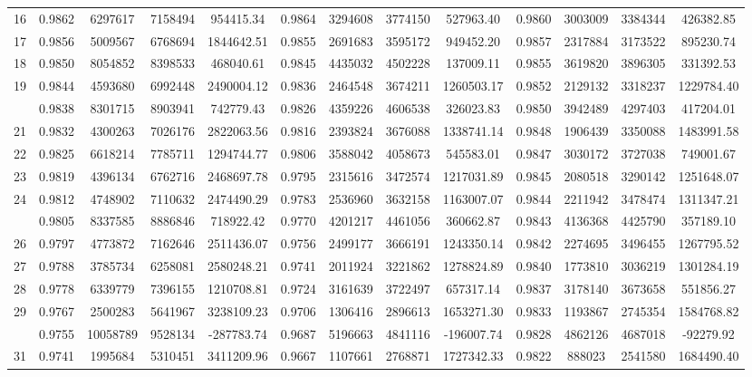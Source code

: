 \documentclass[
  12pt,
]{article}
\begin{document}
\begin{longtable}[t]{lcccccccccccc}
16 & 0.9862 & 6297617 & 7158494 & 954415.34 & 0.9864 & 3294608 & 3774150 & 527963.40 & 0.9860 & 3003009 & 3384344 & 426382.85\\
17 & 0.9856 & 5009567 & 6768694 & 1844642.51 & 0.9855 & 2691683 & 3595172 & 949452.20 & 0.9857 & 2317884 & 3173522 & 895230.74\\
18 & 0.9850 & 8054852 & 8398533 & 468040.61 & 0.9845 & 4435032 & 4502228 & 137009.11 & 0.9855 & 3619820 & 3896305 & 331392.53\\
19 & 0.9844 & 4593680 & 6992448 & 2490004.12 & 0.9836 & 2464548 & 3674211 & 1260503.17 & 0.9852 & 2129132 & 3318237 & 1229784.40\\
\addlinespace
20 & 0.9838 & 8301715 & 8903941 & 742779.43 & 0.9826 & 4359226 & 4606538 & 326023.83 & 0.9850 & 3942489 & 4297403 & 417204.01\\
21 & 0.9832 & 4300263 & 7026176 & 2822063.56 & 0.9816 & 2393824 & 3676088 & 1338741.14 & 0.9848 & 1906439 & 3350088 & 1483991.58\\
22 & 0.9825 & 6618214 & 7785711 & 1294744.77 & 0.9806 & 3588042 & 4058673 & 545583.01 & 0.9847 & 3030172 & 3727038 & 749001.67\\
23 & 0.9819 & 4396134 & 6762716 & 2468697.78 & 0.9795 & 2315616 & 3472574 & 1217031.89 & 0.9845 & 2080518 & 3290142 & 1251648.07\\
24 & 0.9812 & 4748902 & 7110632 & 2474490.29 & 0.9783 & 2536960 & 3632158 & 1163007.07 & 0.9844 & 2211942 & 3478474 & 1311347.21\\
\addlinespace
25 & 0.9805 & 8337585 & 8886846 & 718922.42 & 0.9770 & 4201217 & 4461056 & 360662.87 & 0.9843 & 4136368 & 4425790 & 357189.10\\
26 & 0.9797 & 4773872 & 7162646 & 2511436.07 & 0.9756 & 2499177 & 3666191 & 1243350.14 & 0.9842 & 2274695 & 3496455 & 1267795.52\\
27 & 0.9788 & 3785734 & 6258081 & 2580248.21 & 0.9741 & 2011924 & 3221862 & 1278824.89 & 0.9840 & 1773810 & 3036219 & 1301284.19\\
28 & 0.9778 & 6339779 & 7396155 & 1210708.81 & 0.9724 & 3161639 & 3722497 & 657317.14 & 0.9837 & 3178140 & 3673658 & 551856.27\\
29 & 0.9767 & 2500283 & 5641967 & 3238109.23 & 0.9706 & 1306416 & 2896613 & 1653271.30 & 0.9833 & 1193867 & 2745354 & 1584768.82\\
\addlinespace
30 & 0.9755 & 10058789 & 9528134 & -287783.74 & 0.9687 & 5196663 & 4841116 & -196007.74 & 0.9828 & 4862126 & 4687018 & -92279.92\\
31 & 0.9741 & 1995684 & 5310451 & 3411209.96 & 0.9667 & 1107661 & 2768871 & 1727342.33 & 0.9822 & 888023 & 2541580 & 1684490.40\\

\end{longtable}
\end{document}
